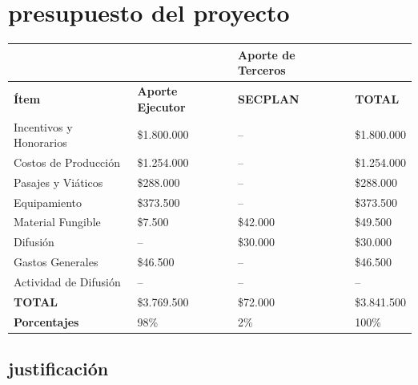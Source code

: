 \documentclass[12pt]{article}
\begin{document}
\newpage
\section{presupuesto del proyecto}
\begin{table}[h]
	\begin{tabular}{|l|l|l|l|}
    \cline{3-3}
    \multicolumn{1}{l}{} &  &\cellcolor{lightgray} \textbf{\sffamily Aporte de	Terceros} & \multicolumn{1}{l}{} \\ 
    \hline
    \rowcolor{tableheadcolor} \textbf{\sffamily Ítem} & \textbf{\sffamily
    Aporte Ejecutor} & \textbf{\sffamily SECPLAN} & \textbf{\sffamily TOTAL} \\ 
    \hline
    Incentivos y Honorarios & \$1.800.000 & -- & \$1.800.000 \\ 
    \hline
    Costos de Producción & \$1.254.000 & -- & \$1.254.000 \\ 
    \hline
    Pasajes y Viáticos & \$288.000 & -- & \$288.000  \\ 
    \hline
    Equipamiento & \$373.500 & -- & \$373.500 \\ 
    \hline
    Material Fungible & \$7.500 & \$42.000 & \$49.500 \\ 
    \hline
    Difusión & -- & \$30.000 & \$30.000 \\ 
    \hline
    Gastos Generales & \$46.500 & -- & \$46.500 \\ 
    \hline
    Actividad de Difusión & -- & -- & -- \\ 
    \hline
    \rowcolor{tableheadcolor} \textbf{\sffamily TOTAL} &\$3.769.500 & \$72.000 & \$3.841.500\\
    \hline
    \rowcolor{tableheadcolor} \textbf{\sffamily Porcentajes} &98\% &2\% &100\% \\
    \hline
	\end{tabular}
\end{table}

\subsection{justificación}
\end{document}
